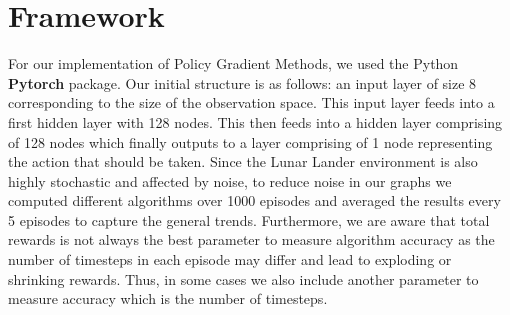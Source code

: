 \documentclass{article}
\begin{document}
\section{Framework}
For our implementation of Policy Gradient Methods, we used the Python \textbf{Pytorch} package. Our initial structure is as follows: an input layer of size 8 corresponding to the size of the observation space. This input layer feeds into a first hidden layer with 128 nodes. This then feeds into a hidden layer comprising of 128 nodes which finally outputs to a layer comprising of 1 node representing the action that should be taken. Since the Lunar Lander environment is also highly stochastic and affected by noise, to reduce noise in our graphs we computed different algorithms over 1000 episodes and averaged the results every 5 episodes to capture the general trends. Furthermore, we are aware that total rewards is not always the best parameter to measure algorithm accuracy as the number of timesteps in each episode may differ and lead to exploding or shrinking rewards. Thus, in some cases we also include another parameter to measure accuracy which is the number of timesteps.

\end{document}
